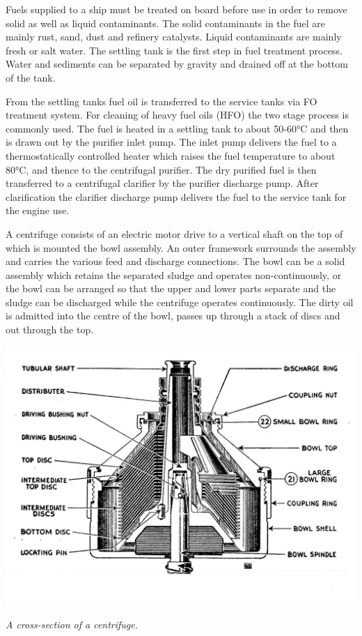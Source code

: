 \documentclass[11pt,a4paper]{article}
\begin{document}
Fuels supplied to a ship must be treated on board before use in order to remove solid as well as liquid contaminants. The solid contaminants in the fuel are mainly rust, sand, dust and refinery catalysts. Liquid contaminants are mainly fresh or salt water. The settling tank is the first step in fuel treatment process. Water and sediments can be separated by gravity and drained off at the bottom of the tank.

From the settling tanks fuel oil is transferred to the service tanks via FO treatment system. For cleaning of heavy fuel oils (HFO) the two stage process is commonly used. The fuel is heated in a settling tank to about 50-60°C and then is drawn out by the purifier inlet pump. The inlet pump delivers the fuel to a thermostatically controlled heater which raises the fuel temperature to about 80°C, and thence to the centrifugal purifier. The dry purified fuel is then transferred to a centrifugal clarifier by the purifier discharge pump. After clarification the clarifier discharge pump delivers the fuel to the service tank for the engine use.

A centrifuge consists of an electric motor drive to a vertical shaft on the top of which is mounted the bowl assembly. An outer framework surrounds the assembly and carries the various feed and discharge connections. The bowl can be a solid assembly which retains the separated sludge and operates non-continuously, or the bowl can be arranged so that the upper and lower parts separate and the sludge can be discharged while the centrifuge operates continuously. The dirty oil is admitted into the centre of the bowl, passes up through a stack of discs and out through the top.\cite{m2}

\begin{center}
\includegraphics[width=\textwidth]{centri.jpg}\par
\textit{A cross-section of a centrifuge.}
\end{center}
\end{document}
